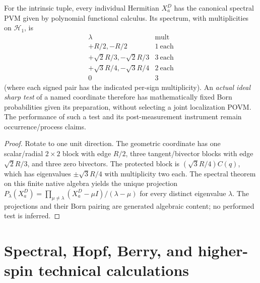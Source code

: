\documentclass[11pt,a4paper]{article}
\begin{document}
\begin{corollary}
\label{p2f:cor:v260-sharp-coordinate-pvm}
For the intrinsic tuple, every individual Hermitian \(X_a^D\) has the
canonical spectral PVM given by polynomial functional calculus. Its
spectrum, with multiplicities on \(\mathcal H_1\), is
\[
 \begin{array}{c|c}
 \lambda & \mathrm{mult}\\\hline
 +R/2,-R/2&1\ \text{each}\\
 +\sqrt2R/3,-\sqrt2R/3&3\ \text{each}\\
 +\sqrt3R/4,-\sqrt3R/4&2\ \text{each}\\
 0&3
 \end{array}
\]
(where each signed pair has the indicated per-sign multiplicity).
An \emph{actual ideal sharp test} of a named coordinate therefore
has mathematically fixed Born probabilities given its preparation,
without selecting a joint localization POVM. The performance of such
a test and its post-measurement instrument remain occurrence/process
claims.
\end{corollary}
\begin{proof}
Rotate to one unit direction. The geometric coordinate has one
scalar/radial \(2\times2\) block with edge \(R/2\), three tangent/bivector
blocks with edge \(\sqrt2R/3\), and three zero bivectors. The protected
block is \((\sqrt3R/4)C(q)\), which has eigenvalues \(\pm\sqrt3R/4\)
with multiplicity two each. The spectral theorem on this finite native
algebra yields the unique projection
\(P_\lambda(X_a^D)=\prod_{\mu\ne\lambda}(X_a^D-\mu I)/(\lambda-\mu)\)
for every distinct eigenvalue \(\lambda\). The projections and their
Born pairing are generated algebraic content; no performed test is inferred.
\end{proof}



\section{Spectral, Hopf, Berry, and higher-spin technical calculations}
\label{p2ftech:sec:spectra}
\end{document}
